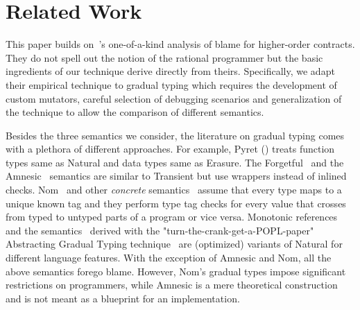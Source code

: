 \section{Related Work}

This paper builds on~\citet{lksfd-popl-2020}'s one-of-a-kind analysis of
blame for higher-order contracts. They do not spell out the notion of the
rational programmer but the basic ingredients of our technique derive
directly from theirs. Specifically, we adapt their empirical technique
to gradual typing which requires the development of custom mutators,
careful selection of debugging scenarios and generalization of the
technique to allow the comparison of different semantics. 

Besides the three semantics we consider, the literature on gradual typing
comes with a plethora of different approaches. For example, Pyret
() treats function types same as Natural
and data types same as Erasure. The Forgetful~\cite{cl-icfp-2017} and
the Amnesic~\cite{gfd-oopsla-2019} semantics are similar  to Transient but
use wrappers instead of inlined checks.  Nom~\cite{mt-oopsla-2017} and
other \emph{concrete\/} semantics~\cite{wnlov-popl-2010, rsfbv-popl-2015,
rzv-ecoop-2015, rat-oopsla-2017} assume that every type maps to a unique
known tag and they perform type tag checks  for every value that crosses
from typed to untyped parts of a program or vice versa.  Monotonic
references~\cite{svctg-esop-2015} and the semantics~\cite{tlt-popl-2019,
etg-icfp-19, tt-scp-20, tgt-popl-18, tt-sas-17} derived with the
"turn-the-crank-get-a-POPL-paper" Abstracting Gradual Typing
technique~\cite{gct-popl-2016} are (optimized) variants of Natural for
different language features.  With the exception of Amnesic and Nom, all
the above semantics forego blame. However,  Nom's gradual types impose
significant restrictions on programmers, while Amnesic is a mere
theoretical construction and is not meant as a blueprint for an
implementation. 
 

